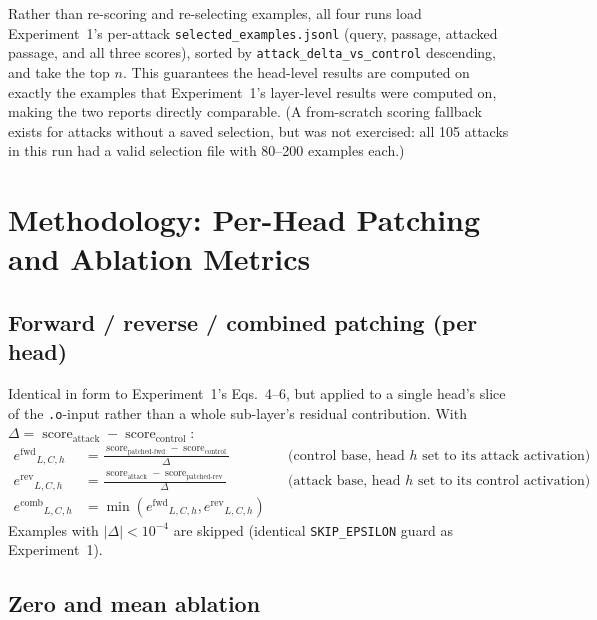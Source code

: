 \documentclass[11pt]{article}
\newcommand{\fwd}{\ensuremath{e^{\mathrm{fwd}}}}
\newcommand{\rev}{\ensuremath{e^{\mathrm{rev}}}}
\newcommand{\score}{\operatorname{score}}
\newcommand{\comb}{\ensuremath{e^{\mathrm{comb}}}}
\begin{document}
Rather than re-scoring and re-selecting examples, all four runs load
Experiment~1's per-attack \texttt{selected\_examples.jsonl}
(query, passage, attacked passage, and all three scores), sorted by
\texttt{attack\_delta\_vs\_control} descending, and take the top $n$. This
guarantees the head-level results are computed on exactly the examples that
Experiment~1's layer-level results were computed on, making the two reports
directly comparable. (A from-scratch scoring fallback exists for attacks
without a saved selection, but was not exercised: all 105 attacks in this
run had a valid selection file with 80--200 examples each.)

\section{Methodology: Per-Head Patching and Ablation Metrics}

\subsection{Forward / reverse / combined patching (per head)}

Identical in form to Experiment~1's Eqs.~4--6, but applied to a single head's
slice of the \texttt{.o}-input rather than a whole sub-layer's residual
contribution. With $\Delta=\score_{\text{attack}}-\score_{\text{control}}$:
\begin{align}
\fwd_{L,C,h} &= \frac{\score_{\text{patched-fwd}} - \score_{\text{control}}}{\Delta}
&&\text{(control base, head $h$ set to its attack activation)} \label{eq:hfwd}\\
\rev_{L,C,h} &= \frac{\score_{\text{attack}} - \score_{\text{patched-rev}}}{\Delta}
&&\text{(attack base, head $h$ set to its control activation)} \label{eq:hrev}\\
\comb_{L,C,h} &= \min(\fwd_{L,C,h}, \rev_{L,C,h}) \label{eq:hcomb}
\end{align}
Examples with $|\Delta|<10^{-4}$ are skipped (identical
\texttt{SKIP\_EPSILON} guard as Experiment~1).

\subsection{Zero and mean ablation}
\end{document}
